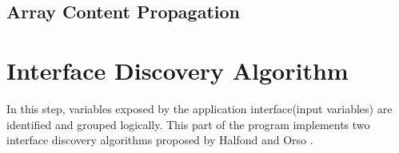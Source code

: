 \subsection{Array Content Propagation}
\blindtext

\section{Interface Discovery Algorithm}
In this step, variables exposed by the application interface(input variables) are identified and grouped logically. This part of the program implements two interface discovery algorithms proposed by Halfond and Orso \cite{ref3}.

